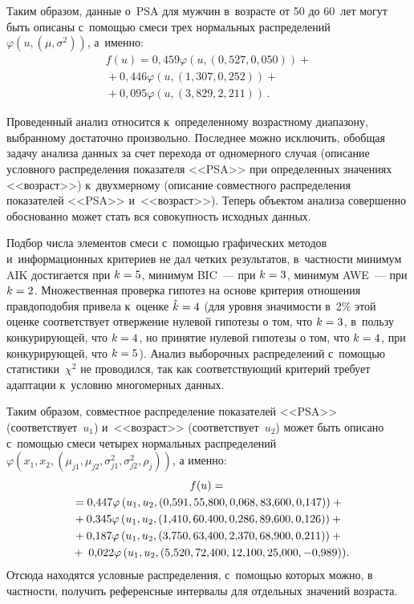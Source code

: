 \begin{multicols}{2}
     Таким образом, данные о~PSA для мужчин в~возрасте от 50 до 60~лет
могут быть описаны с~помощью смеси трех нормальных распределений $\varphi
\left( u,\left(\mu, \sigma^2\right)\right)$, а~именно:
     \begin{multline*}
     f(u) =0{,}459 \varphi\left ( u, (0{,}527, 0{,}050)\right)+{}\\
     {}+ 0{,}446 \varphi\left( u, (1{,}307, 0{,}252)\right) +{}\\
     {}+0{,}095 \varphi\left( u, (3{,}829, 2{,}211)\right)\,.
     \end{multline*}

     Проведенный анализ относится к~определенному возрастному диапазону,
выбранному достаточно произвольно. Последнее можно исключить, обобщая
задачу анализа данных за счет перехода от одномерного случая (описание
условного распределения показателя <<PSA>> при определенных значениях
<<возраст>>) к~двухмерному (описание совместного распределения
показателей <<PSA>> и~<<возраст>>). Теперь объектом анализа совершенно
обоснованно может стать вся совокупность исходных данных.

     Подбор числа элементов смеси с~помощью графических методов и~информационных критериев не дал четких результатов, в~частности минимум
AIK достигается при $k\hm=5$, минимум BIC~--- при $k\hm=3$, минимум
AWE~--- при $k\hm=2$. Множественная проверка гипотез на основе критерия
отношения правдоподобия привела к~оценке $\hat{k}\hm=4$ (для уровня
значимости в~2\% этой оценке соответствует отвержение нулевой гипотезы о
том, что $k\hm=3$, в~пользу конкурирующей, что $k\hm=4$, но принятие
нулевой гипотезы о том, что $k\hm=4$, при конкурирующей, что $k\hm=5$).
Анализ выборочных распределений с~по\-мощью статистики~$\chi^2$ не
проводился, так как соответствующий критерий требует адаптации к~условию
многомерных данных.

     Таким образом, совместное распределение показателей <<PSA>>
(соответствует~$u_1$) и~<<возраст>> (соответствует~$u_2$) может быть
описано с~по\-мощью смеси четырех нормальных распределений $\varphi\left(
x_1,x_2,\left( \mu_{j1}, \mu_{j2}, \sigma^2_{j1}, \sigma^2_{j2},
\rho_j\right)\right)$, а именно:
     {\small\begin{multline*}
     f(u)={}\\
     {}= 0{,}447\varphi\left( u_1,u_2, (0{,}591, 55{,}800, 0{,}068, 83{,}600,
0{,}147)\right) +{}\\
     {}+ 0{,}345\varphi\left( u_1,u_2, (1{,}410, 60{,}400, 0{,}286, 89{,}600,
0{,}126)\right)+{}\\
     {}+ 0{,}187\varphi\left( u_1,u_2, (3{,}750, 63{,}400, 2{,}370, 68{,}900,
0{,}211)\right)+{}\\
     {}+\;0{,}022\varphi\left( u_1,u_2, (5{,}520, 72{,}400, 12{,}100, 25{,}000, -
0{,}989)\right)\!.\hspace*{-4.26pt}
     \end{multline*}}
     Отсюда находятся условные распределения, с~помощью которых можно,
в частности, получить референсные интервалы для отдельных значений
возраста.


\end{multicols}
